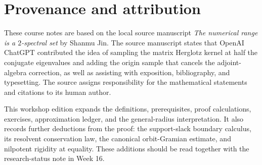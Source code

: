 \documentclass[11pt,oneside,openany]{book}
\theoremstyle{definition}
\theoremstyle{remark}
\begin{document}
\backmatter

\chapter*{Provenance and attribution}

These course notes are based on the local source manuscript
\emph{The numerical range is a \(2\)-spectral set} by Shanmu Jin.
The source manuscript states that OpenAI ChatGPT contributed the idea
of sampling the matrix Herglotz kernel at half the conjugate
eigenvalues and adding the origin sample that cancels the
adjoint-algebra correction, as well as assisting with exposition,
bibliography, and typesetting.  The source assigns responsibility for
the mathematical statements and citations to its human author.

This workshop edition expands the definitions, prerequisites, proof
calculations, exercises, approximation ledger, and the general-radius
interpretation.  It also records further deductions from the proof:
the support-slack boundary calculus, its resolvent conservation law,
the canonical orbit-Gramian estimate, and nilpotent rigidity at
equality.  These additions should be read together with the
research-status note in Week 16.
\end{document}
